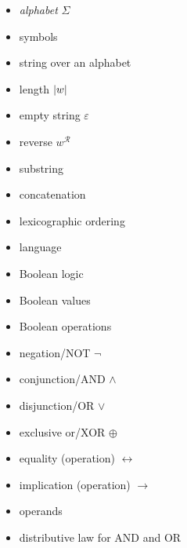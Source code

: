 \documentclass{article}
\begin{document}
\bigskip \indent
\begin{itemize}
\item \emph{alphabet} $\Sigma$

\item symbols

\item string over an alphabet

\item length $\abs{w}$

\item empty string $\varepsilon$

\item reverse $w^\mathcal{R}$

\item substring

\item concatenation

\item lexicographic ordering

\item language

\end{itemize}

\bigskip \indent
\begin{itemize}
\item Boolean logic

\item Boolean values

\item Boolean operations

\item negation/NOT $\neg$

\item conjunction/AND $\wedge$

\item disjunction/OR $\vee$

\item exclusive or/XOR $\oplus$

\item equality (operation) $\leftrightarrow$

\item implication (operation) $\rightarrow$

\item operands

\item distributive law for AND and OR

\end{itemize}
\end{document}
